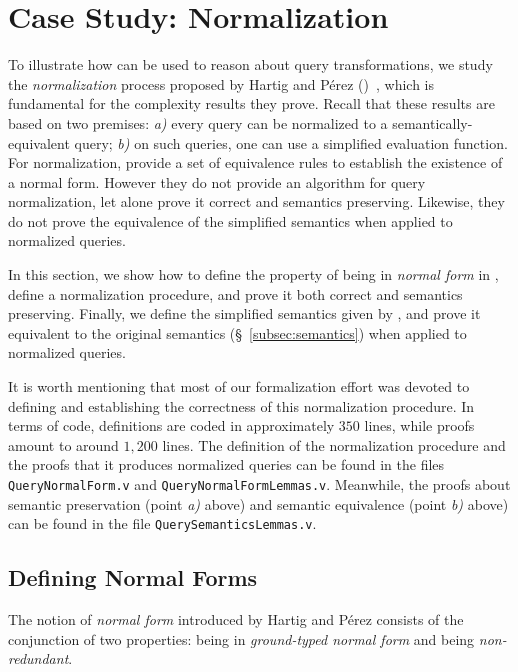 \section{Case Study: Normalization}\label{sec:norm}

To illustrate how \gcoql can be used to reason about query transformations, we study the {\em normalization} process proposed by Hartig and Pérez (\HP)~\cite{gqlph}, which is fundamental for the complexity results they prove.
%
Recall that these results are based on two premises: {\em a)} every query can be normalized to a semantically-equivalent query; {\em b)} on such queries, one can use a simplified evaluation function. For normalization,  \HP provide a set of equivalence rules to establish the existence of a normal form. However they do not provide an algorithm for query normalization, let alone prove it correct and semantics preserving. Likewise, they do not prove the equivalence of the simplified semantics when applied to normalized queries.

In this section, we show how to define the property of being in \textit{normal form} in \gcoql, define a normalization procedure, and prove it both correct and semantics preserving. Finally, we define the simplified semantics given by \HP, and prove it equivalent to the original semantics (\S~\ref{subsec:semantics}) when applied to normalized queries.

It is worth mentioning that most of our formalization effort was devoted to defining and establishing the correctness of this normalization procedure. In terms of code, definitions are coded in approximately $350$ lines, while proofs amount to around $1,200$ lines. The definition of the normalization procedure and the proofs that it produces normalized queries can be found in the files \texttt{QueryNormalForm.v} and \texttt{QueryNormalFormLemmas.v}. Meanwhile, the proofs about semantic preservation (point {\em a)} above) and semantic equivalence (point {\em b)} above) can be found in the file \texttt{QuerySemanticsLemmas.v}.

\subsection{Defining Normal Forms}

The notion of \textit{normal form} introduced by Hartig and Pérez consists of the conjunction of two properties: being in \textit{ground-typed normal form} and being \textit{non-redundant}.

